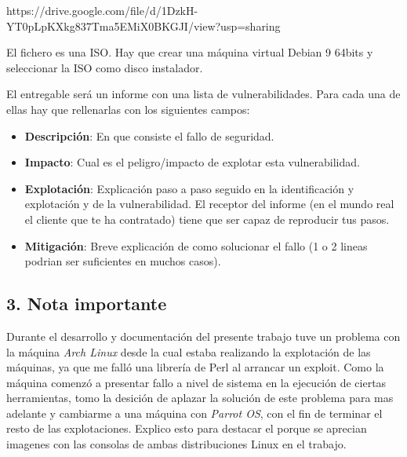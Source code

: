 \documentclass[12pt,oneside,a4paper]{book}
\newcommand{\newsection}[1]{{\subsection*{#1}
\addcontentsline{toc}{section}{#1}}}
\begin{document}
\vspace{1em}

https://drive.google.com/file/d/1DzkH-YT0pLpKXkg837Tma5EMiX0BKGJI/view?usp=sharing

\vspace{1em}

El fichero es una ISO. Hay que crear una máquina virtual Debian 9 64bits y seleccionar la ISO como disco instalador.

\vspace{1em}

El entregable será un informe con una lista de vulnerabilidades. Para cada una de ellas hay que
rellenarlas con los siguientes campos:

\vspace{1em}

\begin{itemize}
	\item \textbf{Descripción}: En que consiste el fallo de seguridad.
	\item \textbf{Impacto}: Cual es el peligro/impacto de explotar esta vulnerabilidad.
	\item \textbf{Explotación}: Explicación paso a paso seguido en la identificación y explotación y de la vulnerabilidad. El receptor del informe (en el mundo real el cliente que te ha contratado) tiene que ser capaz de reproducir tus pasos.
	\item \textbf{Mitigación}: Breve explicación de como solucionar el fallo (1 o 2 lineas podrian ser suficientes en muchos casos).
\end{itemize}	

\vspace{2em}

\newsection{3.	Nota importante}

\vspace{1em}

\hspace{20pt}
Durante el desarrollo y documentación del presente trabajo tuve un problema con la máquina \textit{Arch Linux} desde la cual estaba realizando la explotación de las máquinas, ya que me falló una librería de Perl al arrancar un exploit. Como la máquina comenzó a presentar fallo a nivel de sistema en la ejecución de ciertas herramientas, tomo la desición de aplazar la solución de este problema para mas adelante y cambiarme a una máquina con \textit{Parrot OS}, con el fin de terminar el resto de las explotaciones. Explico esto para destacar el porque se aprecian imagenes con las consolas de ambas distribuciones Linux en el trabajo.
\end{document}
